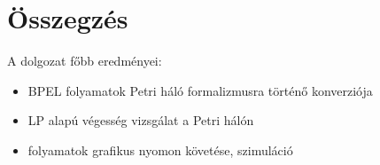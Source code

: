 \chapter{Összegzés}


 A dolgozat főbb eredményei:
\begin{itemize}
\item BPEL folyamatok Petri háló formalizmusra történő konverziója
\item LP alapú végesség vizsgálat a Petri hálón
\item folyamatok grafikus nyomon követése, szimuláció 
\end{itemize}

